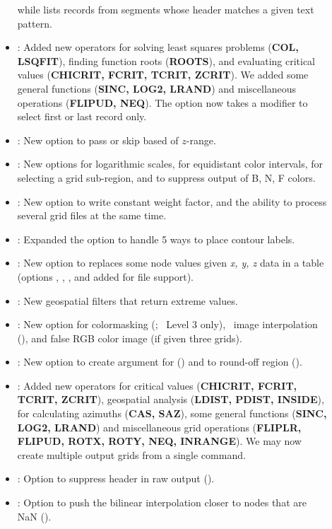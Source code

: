 \begin{description}
\begin{itemize}
while  lists records from segments whose header matches a given text pattern.
\item {}:	Added new operators for solving least squares problems ({\bf COL, LSQFIT}),
finding function roots ({\bf ROOTS}), and evaluating critical values ({\bf CHICRIT, FCRIT, TCRIT, ZCRIT}).
We added some general functions ({\bf SINC, LOG2, LRAND}) and miscellaneous operations ({\bf FLIPUD, NEQ}).
The  option now takes a modifier to select first or last record only.
\item {}:	New option   to pass or skip based of $z$-range.
\item {}:	New options   for logarithmic scales,  for equidistant color
intervals,  for selecting a grid sub-region, and  to suppress output of B, N, F colors.
\item {}:	New option  to write constant weight factor, and the ability to
process several grid files at the same time.
\item {}:	Expanded the  option to handle 5 ways to place contour labels. 
\item {}:	New option  to replaces some node values given {\it x, y, z} data
in a table (options , , , and \Opt{:} added for file support).
\item {}:	New geospatial filters  that return extreme values. 
\item {}:	New option for colormasking (; \PS\ Level 3 only), \PS\ image 
interpolation (), and false RGB color image (if given three grids).
\item {}:	New option to create argument for  () and to round-off
region (). 
\item {}:	Added new operators for critical values ({\bf CHICRIT, FCRIT, TCRIT, ZCRIT}),
geospatial analysis ({\bf LDIST,  PDIST, INSIDE}), for calculating azimuths ({\bf CAS, SAZ}), some general
functions ({\bf SINC, LOG2, LRAND}) and miscellaneous grid operations ({\bf FLIPLR, FLIPUD, ROTX, ROTY, NEQ,
INRANGE}).  We may now create multiple output grids from a single command.
\item {}: Option to suppress header in raw output ().
\item {}:	Option to push the bilinear interpolation closer to nodes that are NaN ().

\end{itemize}
\end{description}
